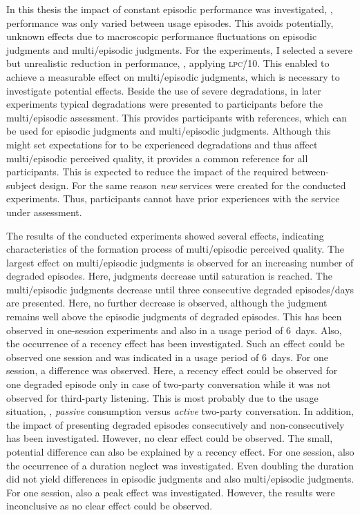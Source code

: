 In this thesis the impact of constant episodic performance was investigated, \ie, performance was only varied between usage episodes.
This avoids potentially, unknown effects due to macroscopic performance fluctuations on episodic judgments and multi\-/episodic judgments.
For the experiments, I selected a severe but unrealistic reduction in performance, \ie, applying \textsc{\lowercase{LPC\=/10}}.
This enabled to achieve a measurable effect on multi\-/episodic judgments, which is necessary to investigate potential effects.
Beside the use of severe degradations, in later experiments typical degradations were presented to participants before the multi\-/episodic assessment.
This provides participants with references, which can be used for episodic judgments and multi\-/episodic judgments.
Although this might set expectations for to be experienced degradations and thus affect multi\-/episodic perceived quality, it provides a common reference for all participants.
This is expected to reduce the impact of the required between-subject design.
For the same reason \emph{new} services were created for the conducted experiments.
Thus, participants cannot have prior experiences with the service under assessment.

The results of the conducted experiments showed several effects, indicating characteristics of the formation process of multi\-/episodic perceived quality.
The largest effect on multi\-/episodic judgments is observed for an increasing number of degraded episodes.
Here, judgments decrease until saturation is reached.
The multi\-/episodic judgments decrease until three consecutive degraded episodes/days are presented.
Here, no further decrease is observed, although the judgment remains well above the episodic judgments of degraded episodes.
This has been observed in one-session experiments and also in a usage period of 6~days.
Also, the occurrence of a recency effect has been investigated.
Such an effect could be observed one session and was indicated in a usage period of 6~days.
For one session, a difference was observed.
Here, a recency effect could be observed for one degraded episode only in case of two-party conversation while it was not observed for third-party listening.
This is most probably due to the usage situation, \ie, \emph{passive} consumption versus \emph{active} two-party conversation.
In addition, the impact of presenting degraded episodes consecutively and non-consecutively has been investigated.
However, no clear effect could be observed.
The small, potential difference can also be explained by a recency effect.
For one session, also the occurrence of a duration neglect was investigated.
Even doubling the duration did not yield differences in episodic judgments and also multi\-/episodic judgments.
For one session, also a peak effect was investigated.
However, the results were inconclusive as no clear effect could be observed.

